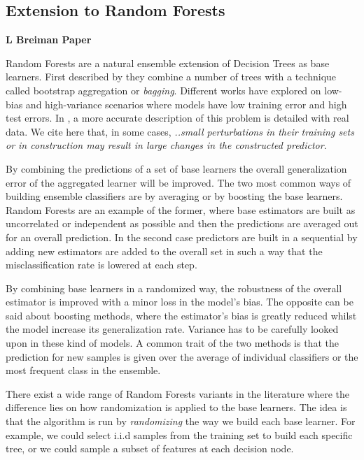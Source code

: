 \subsection{Extension to Random Forests}
\textbf{L Breiman Paper}\cite{breiman-randomforests}
    
    Random Forests are a natural ensemble extension of Decision Trees as base learners. First described by \cite{HoFirstRandomForest} they combine a number of trees with a technique called bootstrap aggregation or \textit{bagging}. Different works have explored on low-bias and high-variance scenarios where models have low training error and high test errors. In \cite{breiman-arcingclassifiers}, a more accurate description of this problem is detailed with  real data. We cite here that, in some cases, \textit{..small perturbations in their  training  sets  or  in  construction  may  result  in  large  changes  in  the  constructed  predictor}.
	
	By combining the predictions of a set of base learners the overall generalization error of the aggregated learner will be improved. The two most common ways of building ensemble classifiers are by averaging or by boosting the base learners. Random Forests are an example of the former, where base estimators are built as uncorrelated or independent as possible and then the predictions are averaged out for an overall prediction. In the second case predictors are built in a sequential by adding new estimators are added to the overall set in such a way that the misclassification rate is lowered at each step.
	
	By combining base learners in a randomized way, the robustness of the overall estimator is improved with a minor loss in the model's bias. The opposite can be said about boosting methods, where the estimator's bias is greatly reduced whilst the model increase its generalization rate. Variance has to be carefully looked upon in these kind of models. A common trait of the two methods is that the prediction for new samples is given over the average of individual classifiers or the most frequent class in the ensemble. 
	
	There exist a wide range of Random Forests variants in the literature \cite{breiman-randomforests} where the difference lies on how randomization is applied to the base learners. The idea is that the algorithm is run by \textit{randomizing } the way we build each base learner. For example, we could select i.i.d samples from the training set to build each specific tree, or we could sample a subset of features at each decision node.


